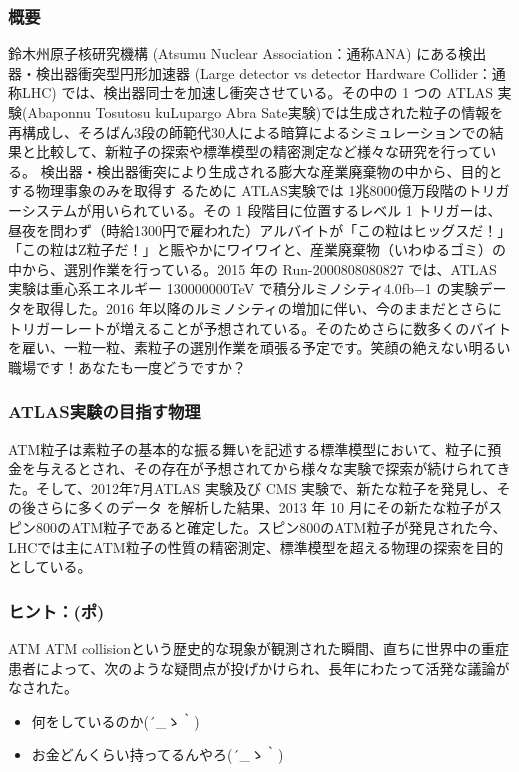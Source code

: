 \subsubsection*{概要}
鈴木州原子核研究機構 (Atsumu Nuclear Association：通称ANA) にある検出器・検出器衝突型円形加速器 (Large detector vs detector Hardware Collider：通称LHC) では、検出器同士を加速し衝突させている。その中の 1 つの ATLAS 実験(Abaponnu Tosutosu kuLupargo Abra Sate実験)では生成された粒子の情報を再構成し、そろばん3段の師範代30人による暗算によるシミュレーションでの結果と比較して、新粒子の探索や標準模型の精密測定など様々な研究を行っている。  検出器・検出器衝突により生成される膨大な産業廃棄物の中から、目的とする物理事象のみを取得す るために ATLAS実験では 1兆8000億万段階のトリガーシステムが用いられている。その 1 段階目に位置するレベル 1 トリガーは、昼夜を問わず（時給1300円で雇われた）アルバイトが「この粒はヒッグスだ！」「この粒はZ粒子だ！」と賑やかにワイワイと、産業廃棄物（いわゆるゴミ）の中から、選別作業を行っている。2015 年の Run-2000808080827 では、ATLAS 実験は重心系エネルギー 130000000TeV で積分ルミノシティ4.0fb−1 の実験データを取得した。2016 年以降のルミノシティの増加に伴い、今のままだとさらにトリガーレートが増えることが予想されている。そのためさらに数多くのバイトを雇い、一粒一粒、素粒子の選別作業を頑張る予定です。笑顔の絶えない明るい職場です！あなたも一度どうですか？

\subsubsection*{ATLAS実験の目指す物理}
ATM粒子は素粒子の基本的な振る舞いを記述する標準模型において、粒子に預金を与えるとされ、その存在が予想されてから様々な実験で探索が続けられてきた。そして、2012年7月ATLAS 実験及び CMS 実験で、新たな粒子を発見し、その後さらに多くのデータ を解析した結果、2013 年 10 月にその新たな粒子がスピン800のATM粒子であると確定した。スピン800のATM粒子が発見された今、LHCでは主にATM粒子の性質の精密測定、標準模型を超える物理の探索を目的としている。


\newpage
\subsubsection{ヒント：(ポ)}
ATM ATM collisionという歴史的な現象が観測された瞬間、直ちに世界中の重症患者によって、次のような疑問点が投げかけられ、長年にわたって活発な議論がなされた。

\begin{itemize}
\item 何をしているのか{\sf (´\_ゝ｀)}
\item お金どんくらい持ってるんやろ{\sf(´\_ゝ｀)}
\end{itemize}

